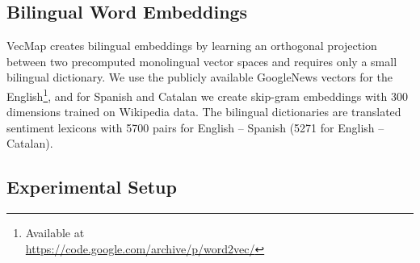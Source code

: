 \documentclass[a4paper,11pt,twocolumn,twoside]{article}
\begin{document}
\subsection{Bilingual Word Embeddings}

VecMap \cite{Artetxe2016,Artetxe2017} creates bilingual embeddings by learning an orthogonal projection between two precomputed monolingual vector spaces and requires only a small bilingual dictionary. We use the publicly available GoogleNews vectors for the English\footnote{Available at \\ \url{https://code.google.com/archive/p/word2vec/}}, and for Spanish and Catalan we create skip-gram embeddings with 300 dimensions trained on Wikipedia data. The bilingual dictionaries are translated sentiment lexicons with 5700 pairs for English -- Spanish (5271 for English -- Catalan).


\subsection{Experimental Setup}
\end{document}
